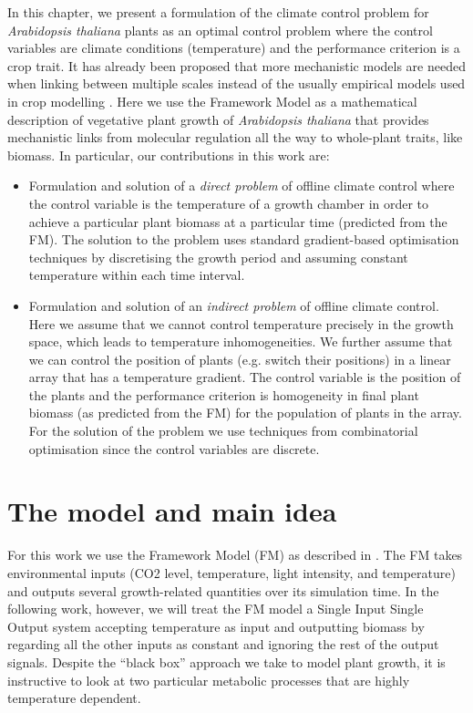 In this chapter, we present a formulation of the climate control problem for
\textit{Arabidopsis thaliana} plants as an optimal control problem
\citep{kirk_optimal_2012} where the control variables are climate conditions
(temperature) and the performance criterion is a crop trait. It has already been
proposed that more mechanistic models are needed when linking between multiple
scales instead of the usually empirical models used in crop modelling
\citep{yin_role_2004, yin_modelling_2010}. Here we use the Framework Model
\citep[FMv1;][]{chew2014multiscale} as a mathematical description of vegetative
plant growth of \textit{Arabidopsis thaliana} that provides mechanistic links
from molecular regulation all the way to whole-plant traits, like biomass. In
particular, our contributions in this work are:
\begin{itemize}
\item Formulation and solution of a \textit{direct problem} of offline climate
  control where the control variable is the temperature of a growth chamber in
  order to achieve a particular plant biomass at a particular time (predicted
  from the FM). The solution to the problem uses standard gradient-based
  optimisation techniques by discretising the growth period and assuming
  constant temperature within each time interval.
\item Formulation and solution of an \textit{indirect problem} of offline
  climate control. Here we assume that we cannot control temperature precisely
  in the growth space, which leads to temperature inhomogeneities. We further
  assume that we can control the position of plants (e.g. switch their
  positions) in a linear array that has a temperature gradient. The control
  variable is the position of the plants and the performance criterion is
  homogeneity in final plant biomass (as predicted from the FM) for the
  population of plants in the array. For the solution of the problem we use
  techniques from combinatorial optimisation since the control variables are
  discrete.
\end{itemize}

\section{The model and main idea}
For this work we use the Framework Model (FM) as described in
\citet{chew2014multiscale}. The FM takes environmental inputs (CO2 level,
temperature, light intensity, and temperature) and outputs several
growth-related quantities over its simulation time. In the following work,
however, we will treat the FM model a Single Input Single Output system
accepting temperature as input and outputting biomass by regarding all the other
inputs as constant and ignoring the rest of the output signals. Despite the
``black box'' approach we take to model plant growth, it is instructive to look
at two particular metabolic processes that are highly temperature dependent.

